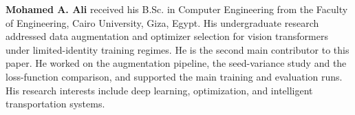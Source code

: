 \medskip\noindent\textbf{Mohamed A. Ali} received his B.Sc. in Computer Engineering from the Faculty of Engineering, Cairo University, Giza, Egypt. His undergraduate research addressed data augmentation and optimizer selection for vision transformers under limited-identity training regimes. He is the second main contributor to this paper. He worked on the augmentation pipeline, the seed-variance study and the loss-function comparison, and supported the main training and evaluation runs. His research interests include deep learning, optimization, and intelligent transportation systems.
